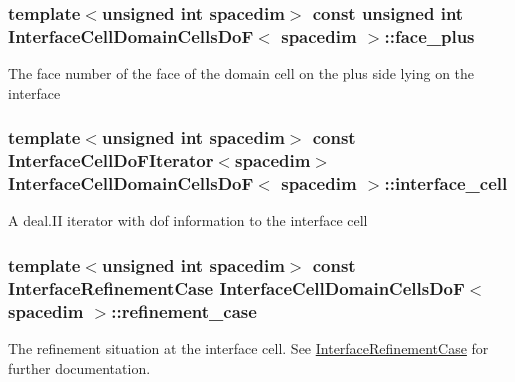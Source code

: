 \subsubsection[{\texorpdfstring{face\+\_\+plus}{face_plus}}]{\setlength{\rightskip}{0pt plus 5cm}template$<$unsigned int spacedim$>$ const unsigned int {\bf Interface\+Cell\+Domain\+Cells\+DoF}$<$ spacedim $>$\+::face\+\_\+plus}\hypertarget{class_interface_cell_domain_cells_do_f_afcb7abea75dfc6e310493a6ff9aadcf6}{}\label{class_interface_cell_domain_cells_do_f_afcb7abea75dfc6e310493a6ff9aadcf6}
The face number of the face of the domain cell on the plus side lying on the interface 
\subsubsection[{\texorpdfstring{interface\+\_\+cell}{interface_cell}}]{\setlength{\rightskip}{0pt plus 5cm}template$<$unsigned int spacedim$>$ const {\bf Interface\+Cell\+Do\+F\+Iterator}$<$spacedim$>$ {\bf Interface\+Cell\+Domain\+Cells\+DoF}$<$ spacedim $>$\+::interface\+\_\+cell}\hypertarget{class_interface_cell_domain_cells_do_f_a5fe7922af91545598d89c77ba42a59da}{}\label{class_interface_cell_domain_cells_do_f_a5fe7922af91545598d89c77ba42a59da}
A deal.\+II iterator with dof information to the interface cell 
\subsubsection[{\texorpdfstring{refinement\+\_\+case}{refinement_case}}]{\setlength{\rightskip}{0pt plus 5cm}template$<$unsigned int spacedim$>$ const {\bf Interface\+Refinement\+Case} {\bf Interface\+Cell\+Domain\+Cells\+DoF}$<$ spacedim $>$\+::refinement\+\_\+case}\hypertarget{class_interface_cell_domain_cells_do_f_aebb7e5f13d079fc83f98f67bcfcc6de3}{}\label{class_interface_cell_domain_cells_do_f_aebb7e5f13d079fc83f98f67bcfcc6de3}
The refinement situation at the interface cell. See \hyperlink{triangulation__system_8h_a4cfb8c5e21535951e919b6a6b1023af7}{Interface\+Refinement\+Case} for further documentation. 
